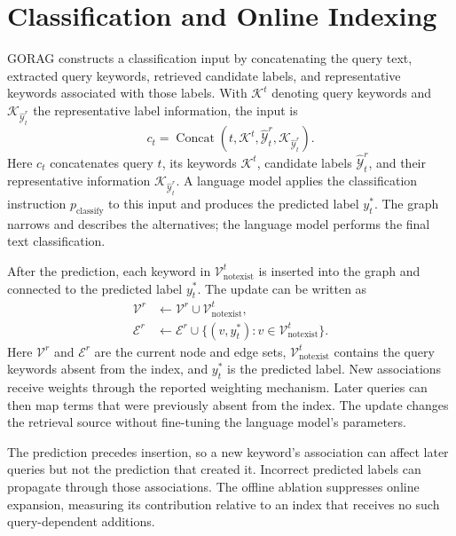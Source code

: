 \section{Classification and Online Indexing}
\label{sec:gorag:online}

GORAG constructs a classification input by concatenating the query text, extracted query keywords, retrieved candidate labels, and representative keywords associated with those labels. With $\mathcal{K}^t$ denoting query keywords and $\mathcal{K}_{\widehat{\mathcal{Y}}_t^r}$ the representative label information, the input is
\begin{equation}
c_t=\operatorname{Concat}\left(t,\mathcal{K}^t,\widehat{\mathcal{Y}}_t^r,\mathcal{K}_{\widehat{\mathcal{Y}}_t^r}\right).
\label{eq:gorag:context}
\end{equation}
Here $c_t$ concatenates query $t$, its keywords $\mathcal K^t$, candidate labels $\widehat{\mathcal Y}_t^r$, and their representative information $\mathcal K_{\widehat{\mathcal Y}_t^r}$. A language model applies the classification instruction $p_{\mathrm{classify}}$ to this input and produces the predicted label $y_t^*$. The graph narrows and describes the alternatives; the language model performs the final text classification.

After the prediction, each keyword in $\mathcal{V}_{\mathrm{notexist}}^t$ is inserted into the graph and connected to the predicted label $y_t^*$. The update can be written as
\begin{align}
\mathcal{V}^r&\leftarrow\mathcal{V}^r\cup\mathcal{V}_{\mathrm{notexist}}^t,\\
\mathcal{E}^r&\leftarrow\mathcal{E}^r\cup\{(v,y_t^*):v\in\mathcal{V}_{\mathrm{notexist}}^t\}.
\label{eq:gorag:update}
\end{align}
Here $\mathcal V^r$ and $\mathcal E^r$ are the current node and edge sets, $\mathcal V_{\mathrm{notexist}}^t$ contains the query keywords absent from the index, and $y_t^*$ is the predicted label. New associations receive weights through the reported weighting mechanism. Later queries can then map terms that were previously absent from the index. The update changes the retrieval source without fine-tuning the language model's parameters.

The prediction precedes insertion, so a new keyword's association can affect later queries but not the prediction that created it. Incorrect predicted labels can propagate through those associations. The offline ablation suppresses online expansion, measuring its contribution relative to an index that receives no such query-dependent additions.

